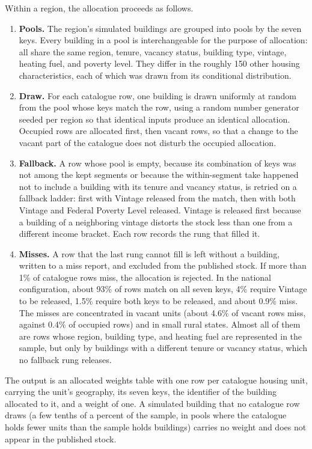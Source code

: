 Within a region, the allocation proceeds as follows.

\begin{enumerate}
    \item \textbf{Pools.} The region's simulated buildings are grouped into pools by the seven keys. Every building in a pool is interchangeable for the purpose of allocation: all share the same region, tenure, vacancy status, building type, vintage, heating fuel, and poverty level. They differ in the roughly 150 other housing characteristics, each of which was drawn from its conditional distribution.
    \item \textbf{Draw.} For each catalogue row, one building is drawn uniformly at random from the pool whose keys match the row, using a random number generator seeded per region so that identical inputs produce an identical allocation. Occupied rows are allocated first, then vacant rows, so that a change to the vacant part of the catalogue does not disturb the occupied allocation.
    \item \textbf{Fallback.} A row whose pool is empty, because its combination of keys was not among the kept segments or because the within-segment take happened not to include a building with its tenure and vacancy status, is retried on a fallback ladder: first with Vintage released from the match, then with both Vintage and Federal Poverty Level released. Vintage is released first because a building of a neighboring vintage distorts the stock less than one from a different income bracket. Each row records the rung that filled it.
    \item \textbf{Misses.} A row that the last rung cannot fill is left without a building, written to a miss report, and excluded from the published stock. If more than 1\% of catalogue rows miss, the allocation is rejected. In the national configuration, about 93\% of rows match on all seven keys, 4\% require Vintage to be released, 1.5\% require both keys to be released, and about 0.9\% miss. The misses are concentrated in vacant units (about 4.6\% of vacant rows miss, against 0.4\% of occupied rows) and in small rural states. Almost all of them are rows whose region, building type, and heating fuel are represented in the sample, but only by buildings with a different tenure or vacancy status, which no fallback rung releases.
\end{enumerate}

The output is an allocated weights table with one row per catalogue housing unit, carrying the unit's geography, its seven keys, the identifier of the building allocated to it, and a weight of one. A simulated building that no catalogue row draws (a few tenths of a percent of the sample, in pools where the catalogue holds fewer units than the sample holds buildings) carries no weight and does not appear in the published stock.

